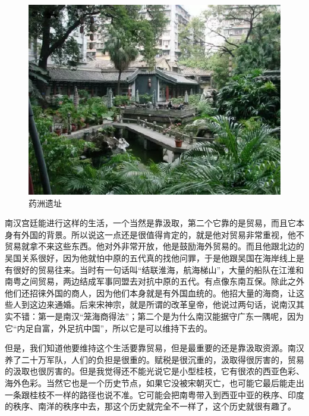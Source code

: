 \begin{figure}
	\centering
	\includegraphics[width=\textwidth]{images/image-33}
	\caption{药洲遗址}
\end{figure}

南汉宫廷能进行这样的生活，一个当然是靠汲取，第二个它靠的是贸易，而且它本身有外国的背景。所以说这一点还是很值得肯定的，就是他对贸易非常重视，他不贸易就拿不来这些东西。他对外非常开放，他是鼓励海外贸易的。而且他跟北边的吴国关系很好，因为他就怕中原的五代真的找他问罪，于是他跟吴国在海岸线上是有很好的贸易往来。当时有一句话叫“结联淮海，航海梯山”，大量的船队在江淮和南粤之间贸易，两边结成军事同盟去对抗中原的五代。有点像东南互保。除此之外他们还招徕外国的商人，因为他们本身就是有外国血统的。他招大量的海商，让这些人到这边来通婚。后来宋神宗，就是所谓的改革皇帝，他说过两句话，说南汉其实不错：第一是南汉“笼海商得法”；第二个是为什么南汉能据守广东一隅呢，因为它“内足自富，外足抗中国”，所以它是可以维持下去的。

但是，我们知道他要维持这个生活要靠贸易，但是最重要的还是靠汲取资源。南汉养了二十万军队，人们的负担是很重的。赋税是很沉重的，汲取得很厉害的，贸易的汲取也很厉害的。但是我觉得还不能光说它是小型桂枝，它有很浓的西亚色彩、海外色彩。当然它也是一个历史节点，如果它没被宋朝灭亡，也可能它最后能走出一条跟桂枝不一样的路径也说不准。它可能会把南粤带入到西亚中亚的秩序、印度的秩序、南洋的秩序中去，那这个历史就完全不一样了，这个历史就很有趣了。

